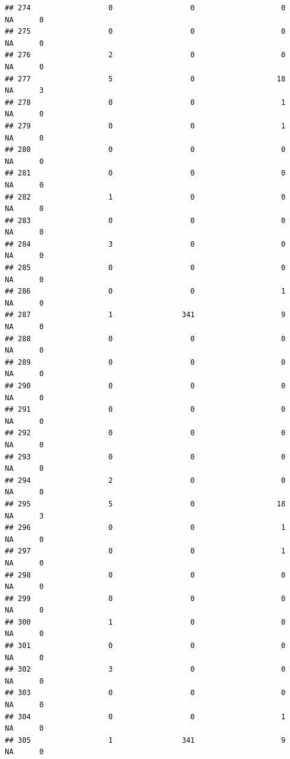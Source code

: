 \documentclass[
]{article}
\begin{document}
\begin{verbatim}
## 274                  0                  0                    0       NA      0
## 275                  0                  0                    0       NA      0
## 276                  2                  0                    0       NA      0
## 277                  5                  0                   18       NA      3
## 278                  0                  0                    1       NA      0
## 279                  0                  0                    1       NA      0
## 280                  0                  0                    0       NA      0
## 281                  0                  0                    0       NA      0
## 282                  1                  0                    0       NA      0
## 283                  0                  0                    0       NA      0
## 284                  3                  0                    0       NA      0
## 285                  0                  0                    0       NA      0
## 286                  0                  0                    1       NA      0
## 287                  1                341                    9       NA      0
## 288                  0                  0                    0       NA      0
## 289                  0                  0                    0       NA      0
## 290                  0                  0                    0       NA      0
## 291                  0                  0                    0       NA      0
## 292                  0                  0                    0       NA      0
## 293                  0                  0                    0       NA      0
## 294                  2                  0                    0       NA      0
## 295                  5                  0                   18       NA      3
## 296                  0                  0                    1       NA      0
## 297                  0                  0                    1       NA      0
## 298                  0                  0                    0       NA      0
## 299                  0                  0                    0       NA      0
## 300                  1                  0                    0       NA      0
## 301                  0                  0                    0       NA      0
## 302                  3                  0                    0       NA      0
## 303                  0                  0                    0       NA      0
## 304                  0                  0                    1       NA      0
## 305                  1                341                    9       NA      0

\end{verbatim}
\end{document}

